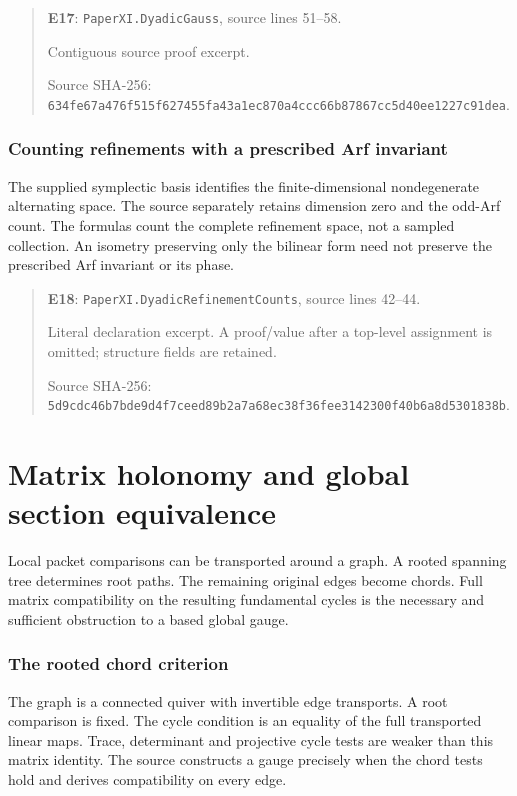 \documentclass[10pt,oneside]{book}
\begin{document}
\begin{quote}\footnotesize\textbf{E17}: \nolinkurl{PaperXI.DyadicGauss}, source lines 51--58.\par Contiguous source proof excerpt.\par Source SHA-256: {\scriptsize\texttt{634fe67a476f515f627455fa43a1ec870a4ccc66b87867cc5d40ee1227c91dea}}.\end{quote}


\subsection{Counting refinements with a prescribed Arf invariant}
\label{guide:E18}
The supplied symplectic basis identifies the finite-dimensional nondegenerate alternating space. The source separately retains dimension zero and the odd-Arf count.
The formulas count the complete refinement space, not a sampled collection. An isometry preserving only the bilinear form need not preserve the prescribed Arf invariant or its phase.

\begin{quote}\footnotesize\textbf{E18}: \nolinkurl{PaperXI.DyadicRefinementCounts}, source lines 42--44.\par Literal declaration excerpt. A proof/value after a top-level assignment is omitted; structure fields are retained.\par Source SHA-256: {\scriptsize\texttt{5d9cdc46b7bde9d4f7ceed89b2a7a68ec38f36fee3142300f40b6a8d5301838b}}.\end{quote}


\chapter{Matrix holonomy and global section equivalence}
Local packet comparisons can be transported around a graph. A rooted spanning tree determines root paths. The remaining original edges become chords. Full matrix compatibility on the resulting fundamental cycles is the necessary and sufficient obstruction to a based global gauge.

\subsection{The rooted chord criterion}
\label{guide:E19}
The graph is a connected quiver with invertible edge transports. A root comparison is fixed. The cycle condition is an equality of the full transported linear maps.
Trace, determinant and projective cycle tests are weaker than this matrix identity. The source constructs a gauge precisely when the chord tests hold and derives compatibility on every edge.
\end{document}
